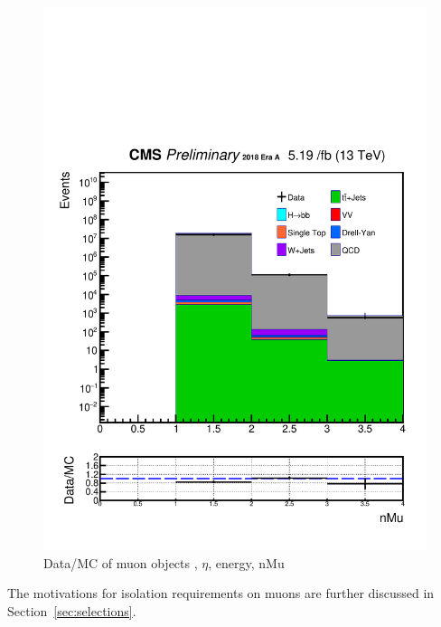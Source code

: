 \begin{figure}[h!]
  \includegraphics[width=0.47\linewidth]{figs/Data_log_AnalysisNote_MS-15_ctauS-10_nMu.pdf}
  \caption{Data/MC of muon objects \pt, $\eta$, energy, nMu}
\end{figure}

The motivations for isolation requirements on muons are further discussed in Section~\ref{sec:selections}.


